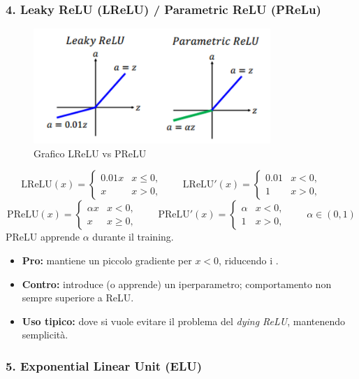 \documentclass[a4paper,12pt]{report}
\begin{document}
	\subsubsection{4. Leaky ReLU (LReLU) / Parametric ReLU (PReLu)}
	
	\begin{figure}[H]
		\centering
		\includegraphics[width=0.8\textwidth]{img/lprelu.png}
		\caption{Grafico LReLU vs PReLU}
	\end{figure}
	
	\[
	\mathrm{LReLU}(x)=\begin{cases}0.01x & x\le0,\\ x & x>0,\end{cases}\qquad
	\mathrm{LReLU}'(x)=\begin{cases}0.01 & x<0,\\ 1 & x>0,\end{cases}\qquad
	\]
	\[
	\mathrm{PReLU}(x)=\begin{cases}\alpha x & x<0,\\ x & x\ge0,\end{cases}\qquad
	\mathrm{PReLU}'(x)=\begin{cases}\alpha & x<0,\\ 1 & x>0,\end{cases}\qquad \alpha\in(0,1)
	\]
	PReLU apprende $\alpha$ durante il training.
	\begin{itemize}
		\item \textbf{Pro:} mantiene un piccolo gradiente per $x<0$, riducendo i .
		\item \textbf{Contro:} introduce (o apprende) un iperparametro; comportamento non sempre superiore a ReLU.
		\item \textbf{Uso tipico:} dove si vuole evitare il problema del \emph{dying ReLU}, mantenendo semplicità.
	\end{itemize}
	
	\subsubsection{5. Exponential Linear Unit (ELU)}
	
\end{document}
